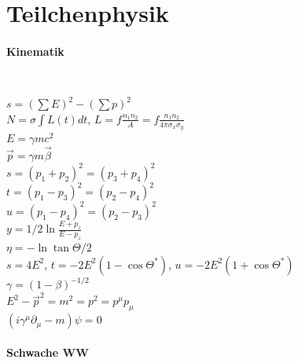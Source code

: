 \documentclass[12pt,a4paper]{article}
\renewcommand{\=}[1]{\stackrel{#1}{=}}
\theoremstyle{definition}
\theoremstyle{remark}
\begin{document}
\newpage
\section{Teilchenphysik}

\paragraph{Kinematik}

\begin{center}
\begin{minipage}[t]{.35\linewidth}
\vspace{0pt}
\noindent\begin{tabular}{ll}
\toprule

\bottomrule
\end{tabular}
\end{minipage}%
\begin{minipage}[t]{.65\linewidth}
\vspace{0pt}
\begin{tabular}{ll}
\toprule


\end{tabular}
\end{minipage}
\end{center}

$s = (\sum E)^2 - (\sum p)^2$\\
$N = \sigma \int L(t) dt$, $L = f \frac{n_1 n_2}{A} = f \frac{n_1 n_2}{4 \pi \sigma_x \sigma_y}$\\
$E = \gamma m c^2$\\
$\vec p = \gamma m \vec \beta$\\
$s = (p_1 + p_2)^2 = (p_3 + p_4)^2$\\
$t = (p_1 - p_3)^2 = (p_2 - p_4)^2$\\
$u = (p_1 - p_4)^2 = (p_2 - p_3)^2$\\
$y = 1/2 \ln \frac{E+p_z}{E-p_z}$\\
$\eta = - \ln \tan \Theta/2$\\
$s = 4E^2$, $t = -2E^2(1-\cos \Theta^*)$, $u = -2E^2(1+\cos \Theta^*)$\\
$\gamma = (1-\beta)^{-1/2}$\\
$E^2 - \vec p^2 = m^2 = p^2 = p^{\mu} p_{\mu}$\\
$(i \gamma^{\mu} \partial_{\mu} - m) \psi = 0$

\paragraph{Schwache WW}
\end{document}
